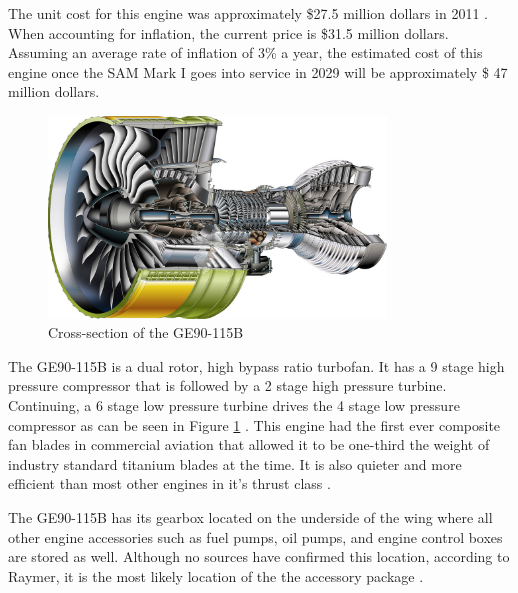 The unit cost for this engine was approximately \$27.5 million dollars in 2011 \cite{gecost}. When accounting for inflation, the current price is \$31.5 million dollars. Assuming an average rate of inflation of 3\% a year, the estimated cost of this engine once the SAM Mark I goes into service in 2029 will be approximately \$ 47 million dollars.

\begin{figure} [h!]
    \centering
    \includegraphics[width=0.8\textwidth]{Photos/ge90cross.jpg}
    \caption{Cross-section of the GE90-115B}
    \label{fig:GeCross}
\end{figure}

The GE90-115B is a dual rotor, high bypass ratio turbofan. It has a 9 stage high pressure compressor that is followed by a 2 stage high pressure turbine. Continuing, a 6 stage low pressure turbine drives the 4 stage low pressure compressor as can be seen in Figure \ref{fig:GeCross} \cite{gecross}. This engine had the first ever composite fan blades in commercial aviation that allowed it to be one-third the weight of industry standard titanium blades at the time. It is also quieter and more efficient than most other engines in it's thrust class \cite{ge90}.

The GE90-115B has its gearbox located on the underside of the wing where all other engine accessories such as fuel pumps, oil pumps, and engine control boxes are stored as well. Although no sources have confirmed this location, according to Raymer, it is the most likely location of the the accessory package \cite{raymer}.


